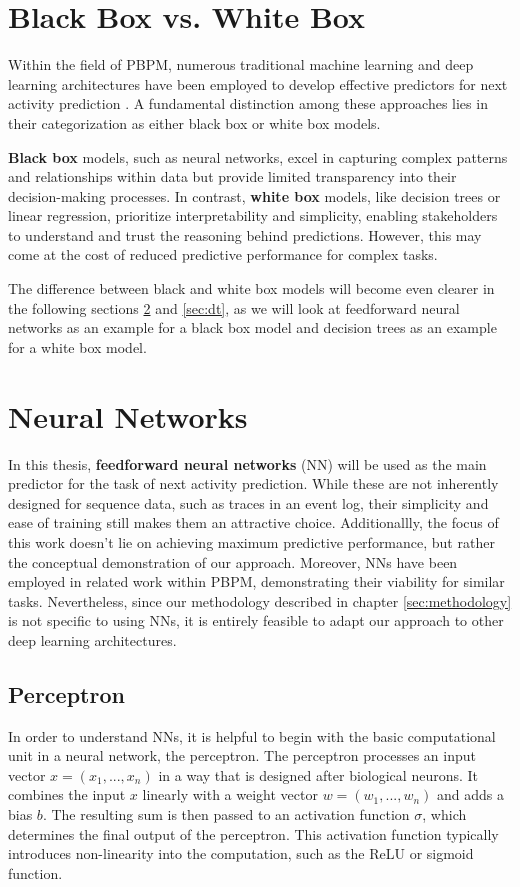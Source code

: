\section{Black Box vs. White Box}
Within the field of PBPM, numerous traditional machine learning
and deep learning architectures have been employed
to develop effective predictors for next activity prediction \cite{ml_pbpm}.
A fundamental distinction among these approaches
lies in their categorization as either black box or white box models.

\textbf{Black box} models, such as neural networks,
excel in capturing complex patterns and relationships within data
but provide limited transparency into their decision-making processes.
In contrast, \textbf{white box} models, like decision trees or linear regression,
prioritize interpretability and simplicity,
enabling stakeholders to understand and trust the reasoning behind predictions.
However, this may come at the cost of reduced predictive performance for complex tasks.
\cite{black_white}

The difference between black and white box models will become even clearer
in the following sections \ref{sec:nn} and \ref{sec:dt},
as we will look at feedforward neural networks as an example for a black box model
and decision trees as an example for a white box model.

\section{Neural Networks}
\label{sec:nn}
In this thesis, \textbf{feedforward neural networks} (NN)
will be used as the main predictor for the task of next activity prediction.
While these are not inherently designed for sequence data,
such as traces in an event log, their simplicity and ease of training still makes them an attractive choice.
Additionallly, the focus of this work doesn't lie on achieving maximum predictive performance,
but rather the conceptual demonstration of our approach.
Moreover, NNs have been employed in related work \cite{fairness_adversarial} within PBPM,
demonstrating their viability for similar tasks.
Nevertheless, since our methodology described in chapter \ref{sec:methodology}
is not specific to using NNs,
it is entirely feasible to adapt our approach to other deep learning architectures.

\subsection{Perceptron}
\label{sec:perceptron}
In order to understand NNs,
it is helpful to begin with the basic computational unit in a neural network,
the perceptron.
The perceptron processes an input vector $x = (x_1, ..., x_n)$
in a way that is designed after biological neurons.
It combines the input $x$ linearly with a weight vector $w = (w_1, ..., w_n)$
and adds a bias $b$.
The resulting sum is then passed to an activation function $\sigma$,
which determines the final output of the perceptron.
This activation function typically introduces non-linearity into the computation,
such as the ReLU or sigmoid function. \cite{perceptron}

